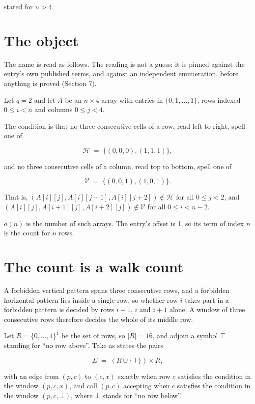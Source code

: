 \documentclass[11pt]{article}
\theoremstyle{definition}
\begin{document}
stated for $n > 4$.

\section{The object}

The name is read as follows. The reading is not a guess: it is pinned against the entry's own published terms, and against an independent enumeration, before anything is proved (Section 7).

Let $q = 2$ and let $A$ be an $n \times 4$ array with entries in $\{0,1,\dots,1\}$, rows indexed $0 \le i < n$ and columns $0 \le j < 4$.

The condition is that no three consecutive cells of a row, read left to right, spell one of

\[\mathcal{H} \;=\; \{(0,0,0), (1,1,1)\},\]

and no three consecutive cells of a column, read top to bottom, spell one of

\[\mathcal{V} \;=\; \{(0,0,1), (1,0,1)\}.\]

That is, $(A[i][j],A[i][j{+}1],A[i][j{+}2]) \notin \mathcal{H}$ for all $0 \le j < 2$, and $(A[i][j],A[i{+}1][j],A[i{+}2][j]) \notin \mathcal{V}$ for all $0 \le i < n-2$.

$a(n)$ is the number of such arrays. The entry's offset is 1, so its term of index $n$ is the count for $n$ rows.

\section{The count is a walk count}

A forbidden vertical pattern spans three consecutive rows, and a forbidden horizontal pattern lies inside a single row, so whether row $i$ takes part in a forbidden pattern is decided by rows $i-1$, $i$ and $i+1$ alone. A window of three consecutive rows therefore decides the whole of its middle row.

Let $R = \{0,\dots,1\}^{4}$ be the set of rows, so $|R| = 16$, and adjoin a symbol $\top$ standing for ``no row above''. Take as states the pairs

\[\Sigma \;=\; (R \cup \{\top\}) \times R,\]

with an edge from $(p,c)$ to $(c,x)$ exactly when row $c$ satisfies the condition in the window $(p,c,x)$, and call $(p,c)$ accepting when $c$ satisfies the condition in the window $(p,c,\bot)$, where $\bot$ stands for ``no row below''.
\end{document}
